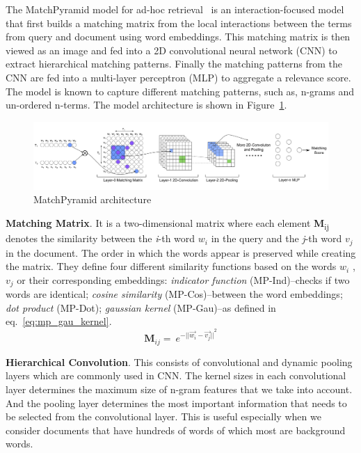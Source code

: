 The MatchPyramid model for ad-hoc retrieval~\citep{matchpyramid16} is an interaction-focused model that first builds a matching matrix from the local interactions between the terms from query and document using word embeddings. 
This matching matrix is then viewed as an image and fed into a 2D convolutional neural network (CNN) to extract hierarchical matching patterns. Finally the matching patterns from the CNN are fed into a multi-layer perceptron (MLP) to aggregate a relevance score. The model is known to capture different matching patterns, such as, n-grams and un-ordered n-terms. The model architecture is shown in Figure~\ref{fig:matchpyramid_architecture}. %
\begin{figure}
    \centering
    \includegraphics[width=\textwidth]{Figures/MATCHPYRAMID.png}
    \caption{MatchPyramid architecture~\citep{matchpyramid16}}
    \label{fig:matchpyramid_architecture}
\end{figure}

\textbf{Matching Matrix}. It is a two-dimensional matrix where each element \textbf{M}\textsubscript{ij} denotes the similarity between the \textit{i}-th word $w_i$ in the query and the \textit{j}-th word $v_j$ in the document. The order in which the words appear is preserved while creating the matrix. They define four different similarity functions based on the words $w_i$ , $v_j$ or their corresponding embeddings: \textit{indicator function} (MP-Ind)--checks if two words are identical; \textit{cosine similarity} (MP-Cos)--between the word embeddings; \textit{dot product} (MP-Dot); \textit{gaussian kernel} (MP-Gau)--as defined in eq.~\ref{eq:mp_gau_kernel}.
\begin{equation}\label{eq:mp_gau_kernel}
    \mathbf{M}_{ij} = \
    e^{{-||\vec{w_i} - \vec{v_j}||}^{2}}
\end{equation}

\textbf{Hierarchical Convolution}. This consists of convolutional and dynamic pooling layers which are commonly used in CNN. The kernel sizes in each convolutional layer determines the maximum size of n-gram features that we take into account. And the pooling layer determines the most important information that needs to be selected from the convolutional layer. This is useful especially when we consider documents that have hundreds of words of which most are background words.

